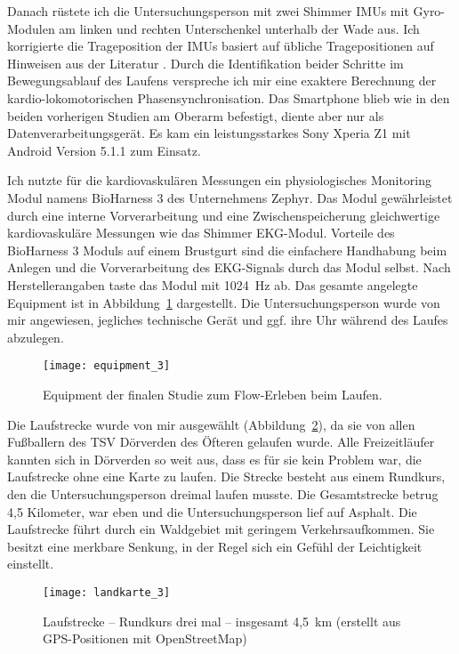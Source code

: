 Danach rüstete ich die Untersuchungsperson mit zwei Shimmer \acp{IMU} mit Gyro-Modulen am linken und rechten Unterschenkel unterhalb der Wade aus. Ich korrigierte die Trageposition der \acp{IMU} basiert auf übliche Tragepositionen auf Hinweisen aus der Literatur \citep[][]{Hreljac1993}. Durch die Identifikation beider Schritte im Bewegungsablauf des Laufens verspreche ich mir eine exaktere Berechnung der kardio-lokomotorischen Phasensynchronisation. Das Smartphone blieb wie in den beiden vorherigen Studien am Oberarm befestigt, diente aber nur als Datenverarbeitungsgerät. Es kam ein leistungsstarkes Sony Xperia Z1 mit Android Version 5.1.1 zum Einsatz.

Ich nutzte für die kardiovaskulären Messungen ein physiologisches Monitoring Modul namens BioHarness 3 des Unternehmens Zephyr. Das Modul gewährleistet durch eine interne Vorverarbeitung und eine Zwischenspeicherung gleichwertige kardiovaskuläre Messungen wie das Shimmer EKG-Modul. Vorteile des BioHarness 3 Moduls auf einem Brustgurt sind die einfachere Handhabung beim Anlegen und die Vorverarbeitung des \ac{EKG}-Signals durch das Modul selbst. Nach Herstellerangaben taste das Modul mit 1024~Hz ab. Das gesamte angelegte Equipment ist in Abbildung~\ref{fig:equipment_3} dargestellt. Die Untersuchungsperson wurde von mir angewiesen, jegliches technische Gerät und ggf. ihre Uhr während des Laufes abzulegen. 
\begin{figure}
	[!htb] \centering 
	\texttt{[image: equipment\_3]} \caption[Equipment der finalen Studie zum Flow-Erleben beim Laufen]{Equipment der finalen Studie zum Flow-Erleben beim Laufen.} \label{fig:equipment_3} 
\end{figure}

Die Laufstrecke wurde von mir ausgewählt (Abbildung~\ref{fig:landkarte_3}), da sie von allen Fußballern des TSV Dörverden des Öfteren gelaufen wurde. Alle Freizeitläufer kannten sich in Dörverden so weit aus, dass es für sie kein Problem war, die Laufstrecke ohne eine Karte zu laufen. Die Strecke besteht aus einem Rundkurs, den die Untersuchungsperson dreimal laufen musste. Die Gesamtstrecke betrug 4,5 Kilometer, war eben und die Untersuchungsperson lief auf Asphalt. Die Laufstrecke führt durch ein Waldgebiet mit geringem Verkehrsaufkommen. Sie besitzt eine merkbare Senkung, in der Regel sich ein Gefühl der Leichtigkeit einstellt. 
\begin{figure}
	[!htb] \centering 
	\texttt{[image: landkarte\_3]} \caption[Laufstrecke -- Rundkurs]{Laufstrecke -- Rundkurs drei mal -- insgesamt 4,5~km (erstellt aus GPS-Positionen mit OpenStreetMap)} \label{fig:landkarte_3} 
\end{figure}

